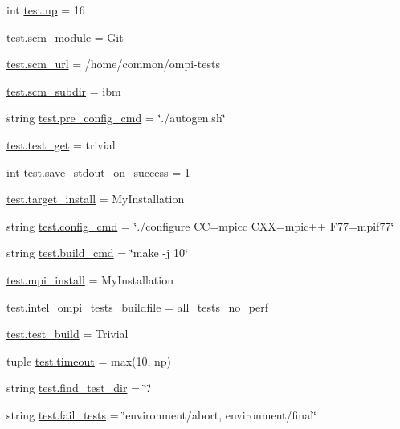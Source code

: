 \begin{DoxyCompactItemize}
\item 
int \hyperlink{namespacetest_a1535a7960a63eaf5e78bb6685abd44e8}{test.\-np} = 16
\item 
\hyperlink{namespacetest_a9c562b60dd319bbf228d80c2285c3fde}{test.\-scm\-\_\-module} = Git
\item 
\hyperlink{namespacetest_a6eab9a211bdeacabe249075b1612c3d9}{test.\-scm\-\_\-url} = /home/common/ompi-\/tests
\item 
\hyperlink{namespacetest_a954686f4e1dc4fd9b53353f75443c6a1}{test.\-scm\-\_\-subdir} = ibm
\item 
string \hyperlink{namespacetest_a96c17bd039b26da494c806d745289285}{test.\-pre\-\_\-config\-\_\-cmd} = \char`\"{}./autogen.\-sh\char`\"{}
\item 
\hyperlink{namespacetest_aed30062928699cb82ebdc01629cc1ec2}{test.\-test\-\_\-get} = trivial
\item 
int \hyperlink{namespacetest_a222c8f53a587af9263d043662a13938b}{test.\-save\-\_\-stdout\-\_\-on\-\_\-success} = 1
\item 
\hyperlink{namespacetest_a567f95611fb12515b764d829ae44aabb}{test.\-target\-\_\-install} = My\-Installation
\item 
string \hyperlink{namespacetest_a94ef7b9eb439fa68dbcb5ffd2b3247d2}{test.\-config\-\_\-cmd} = \char`\"{}./configure C\-C=mpicc C\-X\-X=mpic++ F77=mpif77\char`\"{}
\item 
string \hyperlink{namespacetest_aaa8f1db02a6b0b450565529cebd91d5c}{test.\-build\-\_\-cmd} = \char`\"{}make -\/j 10\char`\"{}
\item 
\hyperlink{namespacetest_a295e67a63678237853b86e59182db440}{test.\-mpi\-\_\-install} = My\-Installation
\item 
\hyperlink{namespacetest_ae4fd57c0f20abaa78ea8f6e1a2dd6625}{test.\-intel\-\_\-ompi\-\_\-tests\-\_\-buildfile} = all\-\_\-tests\-\_\-no\-\_\-perf
\item 
\hyperlink{namespacetest_aec036affe0d08e5c43462900a6548769}{test.\-test\-\_\-build} = Trivial
\item 
tuple \hyperlink{namespacetest_a69079090d6416ccf53f5c565fa229a77}{test.\-timeout} = max(10, np)
\item 
string \hyperlink{namespacetest_a8ff2dd5a1198312fe9ada87a755956ab}{test.\-find\-\_\-test\-\_\-dir} = \char`\"{}.\char`\"{}
\item 
string \hyperlink{namespacetest_ae0ea3fdd2b6f2c8c3bb11f0afc20a097}{test.\-fail\-\_\-tests} = \char`\"{}environment/abort, environment/final\char`\"{}
\item 

\end{DoxyCompactItemize}
